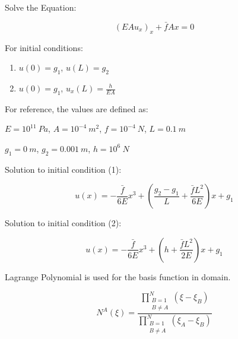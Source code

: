 \documentclass[letterpaper]{report}
\begin{document}
Solve the Equation:

\begin{equation}
\left(EA u_x \right)_x + \bar{f}Ax = 0
\end{equation}

For initial conditions:

\begin{enumerate}
\item $u(0) = g_1$, $u(L) = g_2$
\item $u(0) = g_1$, $u_x(L) = \frac{h}{EA}$
\end{enumerate}

For reference, the values are defined as:

\vspace{0.3in}
$E = 10^{11}~Pa$, $A = 10^{-4}~m^2$, $f = 10^{-4}~N$, $L = 0.1~m$

$g_1 = 0~m$, $g_2 = 0.001~m$, $h = 10^6~N$

\vspace{0.3in}
Solution to initial condition (1):

\begin{equation}
u(x) = -\frac{\bar{f}}{6E} x^3 + \left( \frac{g_2-g_1}{L} + \frac{\bar{f}L^2}{6E} \right) x + g_1
\end{equation}

Solution to initial condition (2):

\begin{equation}
u(x) = -\frac{\bar{f}}{6E} x^3 + \left( h+\frac{\bar{f}L^2}{2E} \right) x + g_1
\end{equation}

Lagrange Polynomial is used for the basis function in domain.

\begin{equation}
N^A(\xi) = \frac{\prod\limits_{\substack{B=1 \\ B\ne A}}^{N} (\xi-\xi_B)}{\prod\limits_{\substack{B=1 \\ B \ne A}}^{N} (\xi_A-\xi_B)}
\end{equation}
\end{document}
